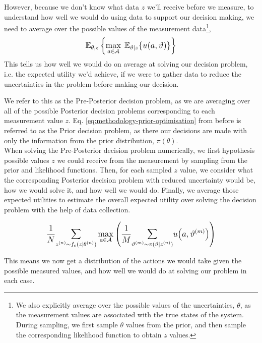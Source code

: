 However, because we don't know what data $z$ we'll receive before we measure, to understand how well we would do using data to support our decision making, we need to average over the possible values of the measurement data\footnote{We also explicitly average over the possible values of the uncertainties, $\theta$, as the measurement values are associated with the true states of the system. During sampling, we first sample $\theta$ values from the prior, and then sample the corresponding likelihood function to obtain $z$ values.},
\begin{equation} \label{eq:methodology-preposterior-value}
    \mathlarger{ \mathbb{E}_{\theta,z} \left\lbrace \max_{a \in \mathcal{A}} \: \mathbb{E}_{\vartheta|z}\lbrace u(a,\vartheta) \rbrace \right\rbrace}
\end{equation}
This tells us how well we would do on average at solving our decision problem, i.e. the expected utility we'd achieve, if we were to gather data to reduce the uncertainties in the problem before making our decision.

We refer to this as the Pre-Posterior decision problem, as we are averaging over all of the possible Posterior decision problems corresponding to each measurement value $z$. Eq. \ref{eq:methodology-prior-optimisation} from before is referred to as the Prior decision problem, as there our decisions are made with only the information from the prior distribution, $\pi(\theta)$.\\

When solving the Pre-Posterior decision problem numerically, we first hypothesis possible values $z$ we could receive from the measurement by sampling from the prior and likelihood functions. Then, for each sampled $z$ value, we consider what the corresponding Posterior decision problem with reduced uncertainty would be, how we would solve it, and how well we would do. Finally, we average those expected utilities to estimate the overall expected utility over solving the decision problem with the help of data collection.

\begin{equation}
    \mathlarger{
        \frac{1}{N} \mathlarger{\sum}_{z^{(n)} \sim f_e(z|\theta^{(n)})} \max_{a \in \mathcal{A}} \Bigg( \frac{1}{M} \mathlarger{\sum}_{\vartheta^{(m)} \sim \pi(\vartheta|z^{(n)})} u\big(a,\vartheta^{(m)}\big) \Bigg)
    }
\end{equation}
\smallskip

\noindent
This means we now get a distribution of the actions we would take given the possible measured values, and how well we would do at solving our problem in each case.\\

